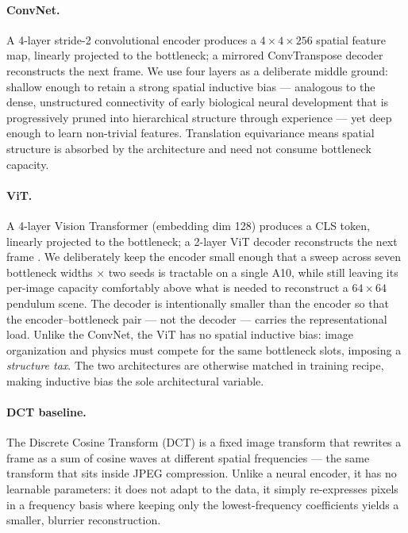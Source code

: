 \documentclass[letterpaper]{article} %
\begin{document}
\paragraph{ConvNet.} A 4-layer stride-2 convolutional encoder produces a $4{\times}4{\times}256$ spatial feature map, linearly projected to the bottleneck; a mirrored ConvTranspose decoder reconstructs the next frame. We use four layers as a deliberate middle ground: shallow enough to retain a strong spatial inductive bias --- analogous to the dense, unstructured connectivity of early biological neural development that is progressively pruned into hierarchical structure through experience \citep{lopez2024toward} --- yet deep enough to learn non-trivial features. Translation equivariance means spatial structure is absorbed by the architecture and need not consume bottleneck capacity.

\paragraph{ViT.} A 4-layer Vision Transformer (embedding dim 128) produces a CLS token, linearly projected to the bottleneck; a 2-layer ViT decoder reconstructs the next frame \citep{he2022masked}. We deliberately keep the encoder small enough that a sweep across seven bottleneck widths $\times$ two seeds is tractable on a single A10, while still leaving its per-image capacity comfortably above what is needed to reconstruct a $64{\times}64$ pendulum scene. The decoder is intentionally smaller than the encoder so that the encoder--bottleneck pair --- not the decoder --- carries the representational load. Unlike the ConvNet, the ViT has no spatial inductive bias: image organization and physics must compete for the same bottleneck slots, imposing a \emph{structure tax}. The two architectures are otherwise matched in training recipe, making inductive bias the sole architectural variable.

\paragraph{DCT baseline.} The Discrete Cosine Transform (DCT) is a fixed image transform that rewrites a frame as a sum of cosine waves at different spatial frequencies --- the same transform that sits inside JPEG compression. Unlike a neural encoder, it has no learnable parameters: it does not adapt to the data, it simply re-expresses pixels in a frequency basis where keeping only the lowest-frequency coefficients yields a smaller, blurrier reconstruction.
\end{document}
